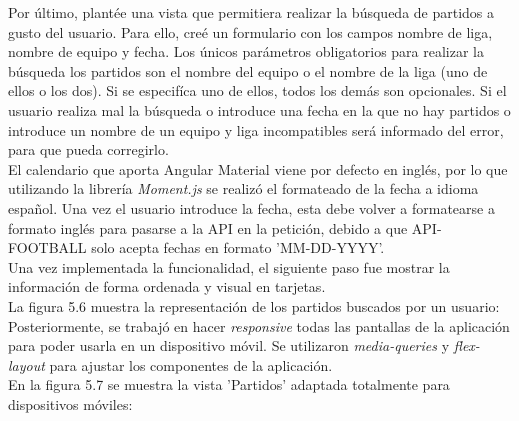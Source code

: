 Por último, plantée una vista que permitiera realizar la búsqueda de partidos a gusto del usuario. Para ello, creé un formulario con los campos nombre de liga, nombre de equipo y fecha. Los únicos parámetros obligatorios para realizar la búsqueda los partidos son el nombre del equipo o el nombre de la liga (uno de ellos o los dos). Si se especifíca uno de ellos, todos los demás son opcionales. Si el usuario realiza mal la búsqueda o introduce una fecha en la que no hay partidos o introduce un nombre de un equipo y liga incompatibles será informado del error, para que pueda corregirlo. \\ 
El calendario que aporta Angular Material viene por defecto en inglés, por lo que utilizando la librería \textit{Moment.js} se realizó el formateado de la fecha a idioma español. Una vez el usuario introduce la fecha, esta debe volver a formatearse a formato inglés para pasarse a la API en la petición, debido a que API-FOOTBALL solo acepta fechas en formato 'MM-DD-YYYY'. \\
Una vez implementada la funcionalidad, el siguiente paso fue mostrar la información de forma ordenada y visual en tarjetas.\\
La figura 5.6 muestra la representación de los partidos buscados por un usuario:
Posteriormente, se trabajó en hacer \textit{responsive} todas las pantallas de la aplicación para poder usarla en un dispositivo móvil. Se utilizaron \textit{media-queries} y \textit{flex-layout} para ajustar los componentes de la aplicación. \\
En la figura 5.7 se muestra la vista 'Partidos' adaptada totalmente para dispositivos móviles:

 
